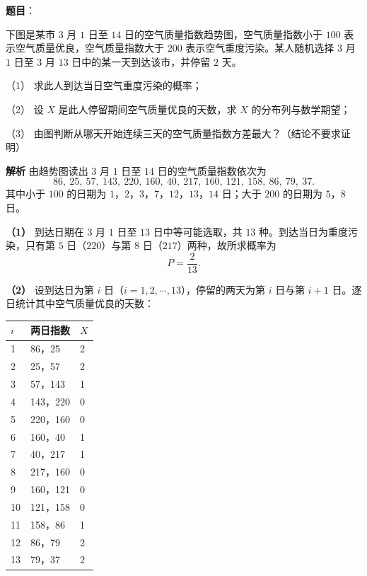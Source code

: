 \begin{answer}

\textbf{题目}：

下图是某市 $3$ 月 $1$ 日至 $14$ 日的空气质量指数趋势图，空气质量指数小于 $100$ 表示空气质量优良，空气质量指数大于 $200$ 表示空气重度污染。某人随机选择 $3$ 月 $1$ 日至 $3$ 月 $13$ 日中的某一天到达该市，并停留 $2$ 天。
\nopagebreak[4]
\begin{center}\end{center}
\nopagebreak[4]
（1） 求此人到达当日空气重度污染的概率；

（2） 设 $X$ 是此人停留期间空气质量优良的天数，求 $X$ 的分布列与数学期望；

（3） 由图判断从哪天开始连续三天的空气质量指数方差最大？（结论不要求证明）

\textbf{解析}
由趋势图读出 $3$ 月 $1$ 日至 $14$ 日的空气质量指数依次为
\nopagebreak[4]
\[86,\ 25,\ 57,\ 143,\ 220,\ 160,\ 40,\ 217,\ 160,\ 121,\ 158,\ 86,\ 79,\ 37.\]
其中小于 $100$ 的日期为 $1$，$2$，$3$，$7$，$12$，$13$，$14$ 日；大于 $200$ 的日期为 $5$，$8$ 日。

\textbf{（1）} 到达日期在 $3$ 月 $1$ 日至 $13$ 日中等可能选取，共 $13$ 种。到达当日为重度污染，只有第 $5$ 日（$220$）与第 $8$ 日（$217$）两种，故所求概率为
\nopagebreak[4]
\[P=\frac{2}{13}.\]

\textbf{（2）} 设到达日为第 $i$ 日（$i=1,2,\cdots,13$），停留的两天为第 $i$ 日与第 $i+1$ 日。逐日统计其中空气质量优良的天数：

\begin{center}
\begin{tabular}{lll}
\toprule
$i$ & 两日指数 & $X$ \\
\midrule
1 & 86，25 & 2 \\
2 & 25，57 & 2 \\
3 & 57，143 & 1 \\
4 & 143，220 & 0 \\
5 & 220，160 & 0 \\
6 & 160，40 & 1 \\
7 & 40，217 & 1 \\
8 & 217，160 & 0 \\
9 & 160，121 & 0 \\
10 & 121，158 & 0 \\
11 & 158，86 & 1 \\
12 & 86，79 & 2 \\
13 & 79，37 & 2 \\
\bottomrule
\end{tabular}
\end{center}


\end{answer}

